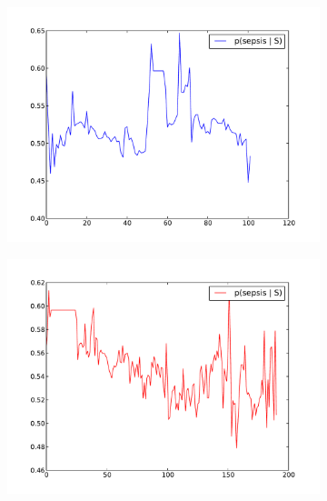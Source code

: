 \documentclass[12pt,solutions]{article}
\begin{document}
\begin{figure}
\begin{subfigure}[b]{0.4\textwidth}
                \includegraphics[width=\textwidth]{nn_plots/probs_c0_3}
                \caption{}
                \label{fig:c0_0}
        \end{subfigure}
        \begin{subfigure}[b]{0.4\textwidth}
                \includegraphics[width=\textwidth]{nn_plots/probs_c1_3}
                \caption{}
                \label{fig:c0_0}
        \end{subfigure}
        \begin{subfigure}[b]{0.4\textwidth}

\end{subfigure}
\end{figure}
\end{document}
